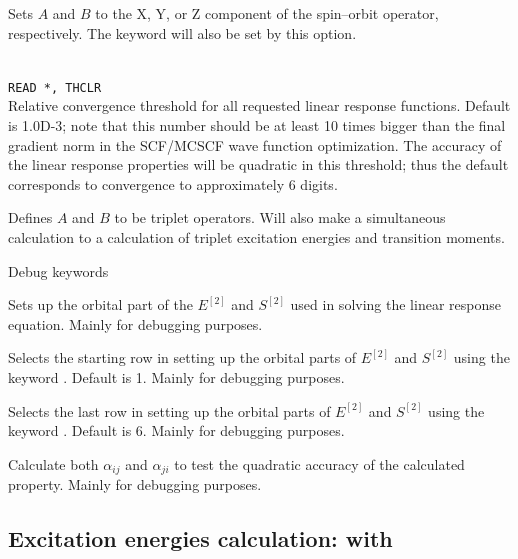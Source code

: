 \begin{description}
\item{}
Sets $A$ and $B$ to the X, Y, or Z component of the spin--orbit
operator, respectively. 
The  keyword will also be set by this option.

\item{}\\
\verb|READ *, THCLR|\\
Relative convergence threshold for all requested linear response functions.
Default is 1.0D-3; note that this number should be at least 10 times
bigger than the final gradient norm in the SCF/MCSCF
wave function optimization. The accuracy of the linear response
properties will be quadratic in this threshold; thus the default
corresponds to convergence to approximately 6 digits.

\item{} Defines $A$ and $B$ to be triplet operators.
Will also make a simultaneous   calculation to
a calculation of triplet excitation energies and transition moments.

\end{description}

Debug keywords

\begin{description}

\item{} Sets up the orbital part of the $E^{\left[2\right]}$
  and $S^{\left[2\right]}$ used in solving the linear response
  equation. Mainly for debugging purposes.

\item{} Selects the starting row in setting up the orbital
  parts of $E^{\left[2\right]}$
  and $S^{\left[2\right]}$ using the keyword . Default is
  1. Mainly for debugging purposes.

\item{} Selects the last row in setting up the orbital
  parts of $E^{\left[2\right]}$
  and $S^{\left[2\right]}$ using the keyword . Default is
  6. Mainly for debugging purposes.

\item{} Calculate both $\alpha_{ij}$ and $\alpha_{ji}$ to
  test the quadratic accuracy of the calculated property. Mainly for
  debugging purposes.

\end{description}

\subsection{Excitation energies calculation:  with }

